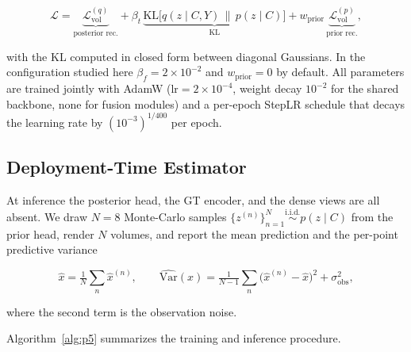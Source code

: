 \begin{equation}
    \mathcal{L}
    = \underbrace{\mathcal{L}_{\mathrm{vol}}^{(q)}}_{\text{posterior rec.}}
    + \beta_t\,
      \underbrace{\mathrm{KL}\big[q(z\mid C,Y)\,\|\,p(z\mid C)\big]}_{\text{KL}}
    + w_{\mathrm{prior}}\,
      \underbrace{\mathcal{L}_{\mathrm{vol}}^{(p)}}_{\text{prior rec.}},
    \label{eq:loss}
\end{equation}

with the KL computed in closed form between diagonal Gaussians. In the
configuration studied here $\beta_f=2{\times}10^{-2}$ and
$w_{\mathrm{prior}}=0$ by default. All parameters
are trained jointly with AdamW ($\mathrm{lr}=2{\times}10^{-4}$, weight
decay $10^{-2}$ for the shared backbone, none for fusion modules) and a
per-epoch StepLR schedule that decays the learning rate by
$(10^{-3})^{1/400}$ per epoch.

\subsection{Deployment-Time Estimator}
\label{sec:method:inference}

At inference the posterior head, the GT encoder, and the dense views are
all absent. We draw $N=8$ Monte-Carlo samples $\{z^{(n)}\}_{n=1}^{N}
\overset{\text{i.i.d.}}{\sim} p(z\mid C)$ from the prior head, render
$N$ volumes, and report the mean prediction and the per-point predictive
variance

\begin{equation}
    \hat{x}
    = \tfrac{1}{N}\textstyle\sum_{n} \hat{x}^{(n)},
    \qquad
    \widehat{\mathrm{Var}}(x)
    = \tfrac{1}{N-1}\textstyle\sum_{n}
      \big(\hat{x}^{(n)}-\hat{x}\big)^2 + \sigma_{\mathrm{obs}}^2 ,
    \label{eq:estimator}
\end{equation}

where the second term is the observation noise.

Algorithm~\ref{alg:p5} summarizes the training and inference
procedure.

